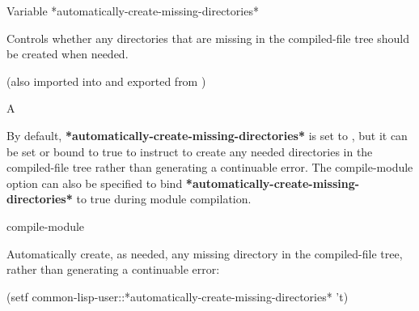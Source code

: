 \documentclass[10pt,twoside,english,pdftex]{article}
\begin{document}
\begin{functiondoc}{Variable}%
  {*automatically-create-missing-directories*}{}%

\fnsyntax

\fnpurpose Controls whether any directories that are missing
in the compiled-file tree should be created when needed.

\fnpackage {} 
(also imported into and exported from )

\fnmodule {}

\fnvaluetype A 

\fninitialvalue {}

\fndescription By default, \textbf{*automatically-create-missing-directories*}
is set to , but it can be set or bound to true to instruct
\textbf{} to create any needed directories in the
compiled-file tree rather than generating a continuable error. The
compile-module option  can also be specified to bind
\textbf{*automatically-create-missing-directories*} to true during module
compilation.

\begin{alsos}{compile-module}
\end{alsos}

\fnexample 
Automatically create, as needed, any missing directory in the compiled-file
tree, rather than generating a continuable error:
\begin{example}
  (setf common-lisp-user::*automatically-create-missing-directories* 't)
\end{example}

\end{functiondoc}

\end{document}
